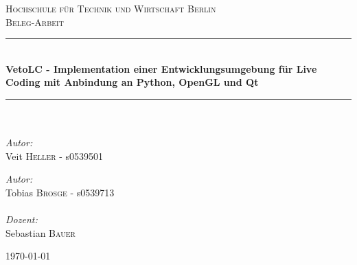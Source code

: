 \begin{titlepage}
\begin{center}


\textsc{\Large Hochschule für Technik und Wirtschaft Berlin}\\[1.5cm]

\textsc{\Large Beleg-Arbeit}\\[0.5cm]


\newcommand{\HRule}{\rule{\linewidth}{0.5mm}}
\HRule \\[0.4cm]
{ \huge \bfseries VetoLC - Implementation einer Entwicklungsumgebung für Live Coding mit Anbindung an Python, OpenGL und Qt}\\[0.4cm]

\HRule \\[1.5cm]

\paragraph{}
\begin{minipage}{0.4\textwidth}
\begin{flushleft} \large
\emph{Autor:}\\
Veit \textsc{Heller} - s0539501
\end{flushleft}
\end{minipage}
\hfill
\begin{minipage}{0.4\textwidth}
\begin{flushright} \large
\emph{Autor:}\\
Tobias \textsc{Brosge} - s0539713
\end{flushright}
\end{minipage}
\paragraph{}
\paragraph{}
\begin{minipage}{0.4\textwidth}
\begin{center} \large
\emph{Dozent:}\\
Sebastian \textsc{Bauer} 
\end{center}
\end{minipage}


\vfill

{\large \today}

\end{center}

\end{titlepage}
